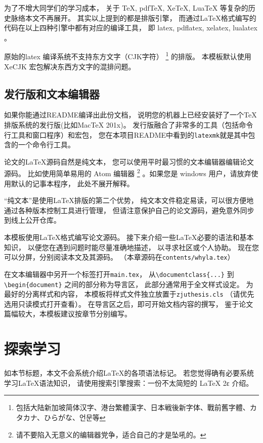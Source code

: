为了不增大同学们的学习成本，
关于 TeX, pdfTeX,  XeTeX,  LuaTeX 等复杂的历史脉络本文不再展开。
其实以上提到的都是排版引擎，
而通过\LaTeX 格式编写的代码在以上四种引擎中都有对应的编译工具，
即 latex, pdflatex, xelatex, lualatex 。

原始的latex 编译系统不支持东方文字（CJK字符）
\footnote{包括大陆新加坡简体汉字、港台繁體漢字、日本戦後新字体、戰前舊字體、カタカナ、ひらがな、언문等}
的排版。
本模板默认使用XeCJK 宏包解决东西方文字的混排问题。

\subsection{发行版和文本编辑器}
如果你能通过README编译出此份文档，
说明您的机器上已经安装好了一个\TeX 排版系统的发行版(比如MacTeX 201x)。
发行版融合了非常多的工具（包括命令行工具和窗口程序）和宏包，
您在本项目README中看到的\texttt{latexmk}就是其中包含的一个命令行工具。


论文的\LaTeX 源码自然是纯文本，
您可以使用平时最习惯的文本编辑器编辑论文源码。
比如使用简单易用的 Atom 编辑器
\footnote{请不要陷入无意义的编辑器党争，适合自己的才是坠吼的。} %
。如果您是 windows 用户，请放弃使用默认的记事本程序，
此处不展开解释。

“纯文本”是使用\LaTeX 排版的第二个优势，
纯文本文件稳定易读，可以很方便地通过各种版本控制工具进行管理，
但请注意保护自己的论文源码，避免意外同步到线上公开仓库。

本模板使用\LaTeX 格式编写论文源码。
\label{dirtree}
接下来介绍一些\LaTeX 必要的语法和基本知识，
以便您在遇到问题时能尽量准确地描述，
以寻求社区或个人协助。
现在您可以分屏，分别阅读本文及其源码。
（本章源码在\texttt{contents/whyla.tex}）


在文本编辑器中另开一个标签打开\texttt{main.tex}，
从\texttt{\textbackslash documentclass\{...\}}
到\\\texttt{\textbackslash begin\{document\}}
之间的部分称为导言区，
此部分通常用于全文样式设定。
为最好的分离样式和内容，
本模板将样式文件独立放置于\texttt{zjuthesis.cls}
（请优先选用只读模式打开查看）。
在导言区之后，即可开始文档内容的撰写，
鉴于论文篇幅较大，本模板建议按章节分别编写。

\section{探索学习}
如本节标题，本文不会系统介绍\LaTeX 的各项语法标记。
若您觉得确有必要系统学习\LaTeX 语法知识，
请使用搜索引擎搜索：一份不太简短的 LaTeX 2ε 介绍。

